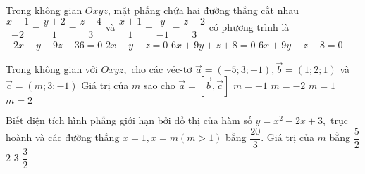 \begin{ex}%
	Trong không gian $ Oxyz $, mặt phẳng chứa hai đường thẳng cắt nhau $ \dfrac{x-1}{-2}=\dfrac{y+2}{1}=\dfrac{z-4}{3} $ và $ \dfrac{x+1}{1}=\dfrac{y}{-1}=\dfrac{z+2}{3} $ có phương trình là
	\choice
	{$-2x-y+9z-36=0$}
	{$2x-y-z=0$}
	{\True $6x+9y+z+8=0$}
	{ $6x+9y+z-8=0$}
\end{ex}

\begin{ex}%
	Trong không gian với  $Oxyz,$ cho các véc-tơ $\vec{a}=(-5;3;-1),\vec{b}=(1;2;1)$ và $ \vec{c}=(m;3;-1) $ Giá trị của $ m $ sao cho $ \vec{a}=[\vec{b},\vec{c}] $
	\choice
	{ $m=-1$}
	{$m=-2$}
	{$m=1$}
	{\True $m=2$}
\end{ex}


\begin{ex}%
	Biết diện tích hình phẳng giới hạn bởi đồ thị của hàm số $ y=x^2-2x+3, $ trục hoành và các đường thẳng $ x=1,x=m(m>1) $ bằng $ \dfrac{20}{3}. $ Giá trị của $ m $ bằng
	\choice
	{$\dfrac{5}{2}$}
	{$2$}
	{\True $3$}
	{$\dfrac{3}{2}$}
	
\end{ex}



